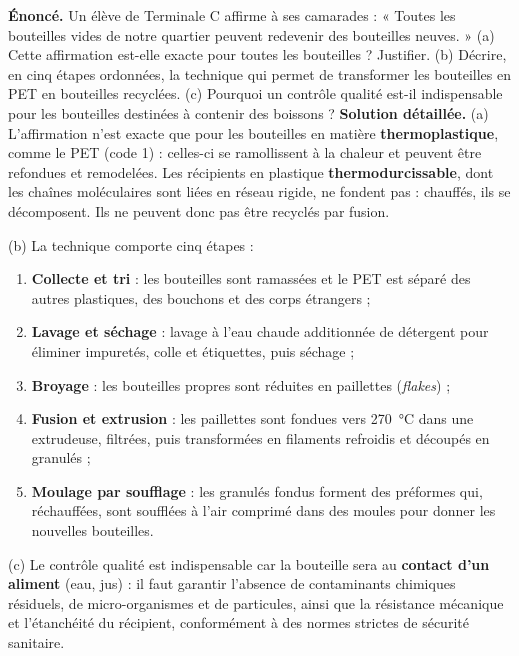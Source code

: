 \documentclass[11pt]{article}
\begin{document}
\begin{exoresolu}
\textbf{Énoncé.} Un élève de Terminale C affirme à ses camarades : « Toutes les bouteilles vides de notre quartier peuvent redevenir des bouteilles neuves. » (a) Cette affirmation est-elle exacte pour toutes les bouteilles ? Justifier. (b) Décrire, en cinq étapes ordonnées, la technique qui permet de transformer les bouteilles en PET en bouteilles recyclées. (c) Pourquoi un contrôle qualité est-il indispensable pour les bouteilles destinées à contenir des boissons ?
\tcblower
\textbf{Solution détaillée.}
(a) L'affirmation n'est exacte que pour les bouteilles en matière \textbf{thermoplastique}, comme le PET (code 1) : celles-ci se ramollissent à la chaleur et peuvent être refondues et remodelées. Les récipients en plastique \textbf{thermodurcissable}, dont les chaînes moléculaires sont liées en réseau rigide, ne fondent pas : chauffés, ils se décomposent. Ils ne peuvent donc pas être recyclés par fusion.

(b) La technique comporte cinq étapes :
\begin{enumerate}
\item \textbf{Collecte et tri} : les bouteilles sont ramassées et le PET est séparé des autres plastiques, des bouchons et des corps étrangers ;
\item \textbf{Lavage et séchage} : lavage à l'eau chaude additionnée de détergent pour éliminer impuretés, colle et étiquettes, puis séchage ;
\item \textbf{Broyage} : les bouteilles propres sont réduites en paillettes (\emph{flakes}) ;
\item \textbf{Fusion et extrusion} : les paillettes sont fondues vers \SI{270}{\celsius} dans une extrudeuse, filtrées, puis transformées en filaments refroidis et découpés en granulés ;
\item \textbf{Moulage par soufflage} : les granulés fondus forment des préformes qui, réchauffées, sont soufflées à l'air comprimé dans des moules pour donner les nouvelles bouteilles.
\end{enumerate}

(c) Le contrôle qualité est indispensable car la bouteille sera au \textbf{contact d'un aliment} (eau, jus) : il faut garantir l'absence de contaminants chimiques résiduels, de micro-organismes et de particules, ainsi que la résistance mécanique et l'étanchéité du récipient, conformément à des normes strictes de sécurité sanitaire.
\end{exoresolu}
\end{document}
